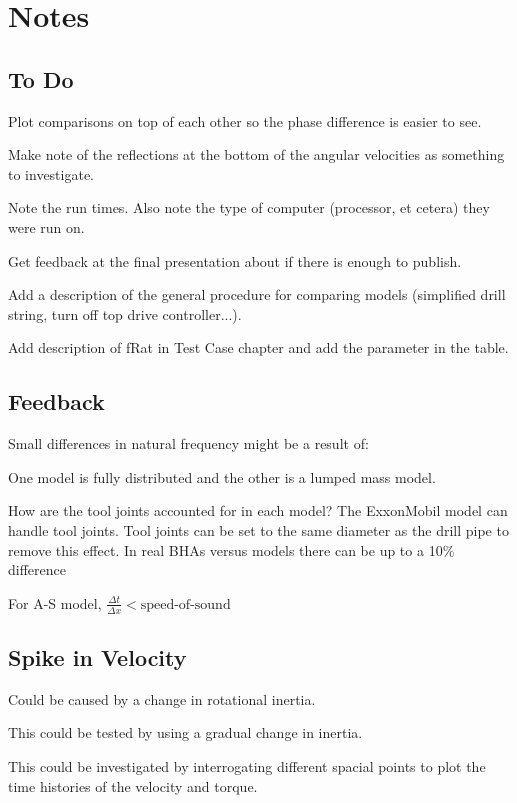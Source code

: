 \chapter{Notes}
\section{To Do}
\begin{bulletedlist}
	\item Plot comparisons on top of each other so the phase difference is easier to see.
	\item Make note of the reflections at the bottom of the angular velocities as something to investigate.
	\item Note the run times.  Also note the type of computer (processor, et cetera) they were run on.
	\item Get feedback at the final presentation about if there is enough to publish.
	\item Add a description of the general procedure for comparing models (simplified drill string, turn off top drive controller...).
    \item Add description of fRat in Test Case chapter and add the parameter in the table.
\end{bulletedlist}

\section{Feedback}
Small differences in natural frequency might be a result of:
\begin{bulletedlist}
	\item One model is fully distributed and the other is a lumped mass model.
	\item How are the tool joints accounted for in each model?  The ExxonMobil model can handle tool joints.  Tool joints can be set to the same diameter as the drill pipe to remove this effect.  In real BHAs versus models there can be up to a 10\% difference
	\item For A-S model, $\frac{\Delta t}{\Delta x} < \textrm{speed-of-sound}$
\end{bulletedlist}

\section{Spike in Velocity}
\begin{bulletedlist}
	\item Could be caused by a change in rotational inertia.
	\item This could be tested by using a gradual change in inertia.
	\item This could be investigated by interrogating different spacial points to plot the time histories of the velocity and torque.
\end{bulletedlist}

